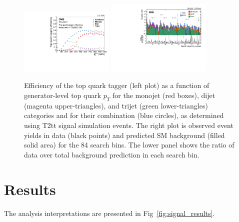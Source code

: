 \documentclass{PoS}
\begin{document}
\begin{figure}[htbp]
 \begin{center}
  \includegraphics[width=0.40\textwidth]{figures/Tagger_Paper.pdf}
  \includegraphics[width=0.45\textwidth]{figures/UnblindPlots.pdf}
 \end{center}
 \caption
 {
  Efficiency of the top quark tagger (left plot) as a function of generator-level top quark $p_{T}$ for
the monojet (red boxes), dijet (magenta upper-triangles), and trijet (green lower-triangles) categories
and for their combination (blue circles), as determined using T2tt signal simulation events. The right plot is observed event yields in data (black points) and predicted SM background (filled solid area) for the 84 search bins. The lower panel shows the ratio of data over total background prediction in each search bin.
 }
 \label{fig:c4ttefftight}
\end{figure}

\clearpage
\section{Results}

The analysis interpretations are presented in Fig~\ref{fig:signal_results}. 
\end{document}
